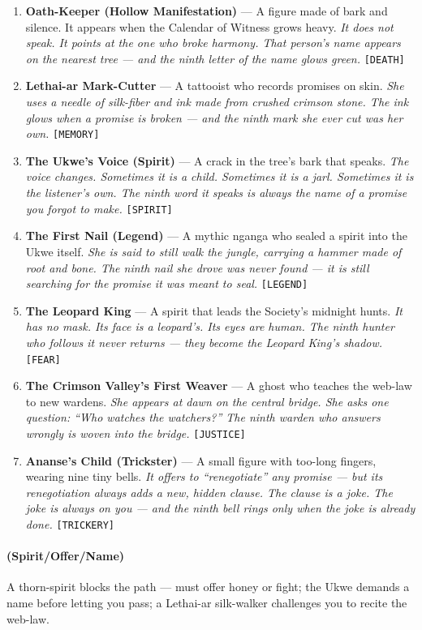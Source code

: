 \begin{enumerate}
\item \textbf{Oath-Keeper (Hollow Manifestation)} --- A figure made of bark and silence. It appears when the Calendar of Witness grows heavy.
  \hfill \textit{It does not speak. It points at the one who broke harmony. That person's name appears on the nearest tree --- and the ninth letter of the name glows green.} \texttt{[DEATH]}
\item \textbf{Lethai-ar Mark-Cutter} --- A tattooist who records promises on skin.
  \hfill \textit{She uses a needle of silk-fiber and ink made from crushed crimson stone. The ink glows when a promise is broken --- and the ninth mark she ever cut was her own.} \texttt{[MEMORY]}
\item[J] \textbf{The Ukwe's Voice (Spirit)} --- A crack in the tree's bark that speaks.
  \hfill \textit{The voice changes. Sometimes it is a child. Sometimes it is a jarl. Sometimes it is the listener's own. The ninth word it speaks is always the name of a promise you forgot to make.} \texttt{[SPIRIT]}
\item[Q] \textbf{The First Nail (Legend)} --- A mythic nganga who sealed a spirit into the Ukwe itself.
  \hfill \textit{She is said to still walk the jungle, carrying a hammer made of root and bone. The ninth nail she drove was never found --- it is still searching for the promise it was meant to seal.} \texttt{[LEGEND]}
\item[K] \textbf{The Leopard King} --- A spirit that leads the Society's midnight hunts.
  \hfill \textit{It has no mask. Its face is a leopard's. Its eyes are human. The ninth hunter who follows it never returns --- they become the Leopard King's shadow.} \texttt{[FEAR]}
\item[A] \textbf{The Crimson Valley's First Weaver} --- A ghost who teaches the web-law to new wardens.
  \hfill \textit{She appears at dawn on the central bridge. She asks one question: ``Who watches the watchers?'' The ninth warden who answers wrongly is woven into the bridge.} \texttt{[JUSTICE]}
\item[A+] \textbf{Ananse's Child (Trickster)} --- A small figure with too-long fingers, wearing nine tiny bells.
  \hfill \textit{It offers to ``renegotiate'' any promise --- but its renegotiation always adds a new, hidden clause. The clause is a joke. The joke is always on you --- and the ninth bell rings only when the joke is already done.} \texttt{[TRICKERY]}
\end{enumerate}

\paragraph*{(Spirit/Offer/Name)} A thorn-spirit blocks the path --- must offer honey or fight; the Ukwe demands a name before letting you pass; a Lethai-ar silk-walker challenges you to recite the web-law.

